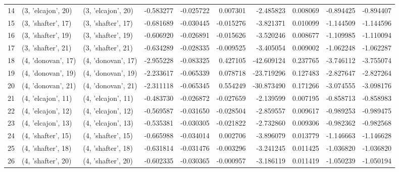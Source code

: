 \begin{tabular}{lllrrrrrrr}
14 &  (3, 'elcajon', 20) &  (3, 'elcajon', 20) & -0.583277 & -0.025722 &  0.007301 &  -2.485823 &  0.008069 & -0.894425 & -0.894407 \\
15 &  (3, 'shafter', 17) &  (3, 'shafter', 17) & -0.681689 & -0.030445 & -0.015276 &  -3.821371 &  0.010099 & -1.144509 & -1.144596 \\
16 &  (3, 'shafter', 19) &  (3, 'shafter', 19) & -0.606920 & -0.026891 & -0.015626 &  -3.520246 &  0.008677 & -1.109985 & -1.110094 \\
17 &  (3, 'shafter', 21) &  (3, 'shafter', 21) & -0.634289 & -0.028335 & -0.009525 &  -3.405054 &  0.009002 & -1.062248 & -1.062287 \\
18 &  (4, 'donovan', 17) &  (4, 'donovan', 17) & -2.955228 & -0.083325 &  0.427105 & -42.609124 &  0.237765 & -3.746112 & -3.755074 \\
19 &  (4, 'donovan', 19) &  (4, 'donovan', 19) & -2.233617 & -0.065339 &  0.078718 & -23.719296 &  0.127483 & -2.827647 & -2.827264 \\
20 &  (4, 'donovan', 21) &  (4, 'donovan', 21) & -2.311118 & -0.065345 &  0.554249 & -30.873490 &  0.171266 & -3.074555 & -3.098176 \\
21 &  (4, 'elcajon', 11) &  (4, 'elcajon', 11) & -0.483730 & -0.026872 & -0.027659 &  -2.139599 &  0.007195 & -0.858713 & -0.858983 \\
22 &  (4, 'elcajon', 12) &  (4, 'elcajon', 12) & -0.569587 & -0.031650 & -0.028504 &  -2.859557 &  0.009617 & -0.989253 & -0.989475 \\
23 &  (4, 'elcajon', 13) &  (4, 'elcajon', 13) & -0.535381 & -0.030305 & -0.021822 &  -2.732860 &  0.009306 & -0.982362 & -0.982568 \\
24 &  (4, 'shafter', 15) &  (4, 'shafter', 15) & -0.665988 & -0.034014 &  0.002706 &  -3.896079 &  0.013779 & -1.146663 & -1.146628 \\
25 &  (4, 'shafter', 18) &  (4, 'shafter', 18) & -0.631814 & -0.031476 & -0.003296 &  -3.241245 &  0.011425 & -1.036820 & -1.036820 \\
26 &  (4, 'shafter', 20) &  (4, 'shafter', 20) & -0.602335 & -0.030365 & -0.000957 &  -3.186119 &  0.011419 & -1.050239 & -1.050194 \\
\bottomrule
\end{tabular}
